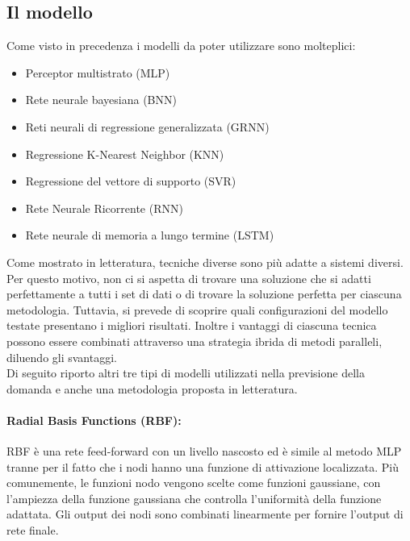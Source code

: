 \documentclass[12pt,a4paper]{report}
\begin{document}
\subsection{Il modello}
Come visto in precedenza i modelli da poter utilizzare sono molteplici:
\begin{itemize}
    \item Perceptor multistrato (MLP)
    \item Rete neurale bayesiana (BNN)
    \item Reti neurali di regressione generalizzata (GRNN)
    \item Regressione K-Nearest Neighbor (KNN)
    \item Regressione del vettore di supporto (SVR)
    \item Rete Neurale Ricorrente (RNN)
    \item Rete neurale di memoria a lungo termine (LSTM)
\end{itemize}

Come mostrato in letteratura, tecniche diverse sono più adatte a sistemi diversi. Per questo motivo, non ci si aspetta di trovare una soluzione che si adatti perfettamente a tutti i set di dati o di trovare la soluzione perfetta per ciascuna metodologia. Tuttavia, si prevede di scoprire quali configurazioni del modello testate presentano i migliori risultati.
Inoltre i vantaggi di ciascuna tecnica possono essere combinati attraverso una strategia ibrida di metodi paralleli, diluendo gli svantaggi.\\
Di seguito riporto altri tre tipi di modelli utilizzati nella previsione della domanda e anche una metodologia proposta in letteratura.

\paragraph*{Radial Basis Functions (RBF):}
RBF è una rete feed-forward con un livello nascosto ed è simile al metodo MLP tranne per il fatto che i nodi hanno una funzione di attivazione localizzata. Più comunemente, le funzioni nodo vengono scelte come funzioni gaussiane, con l'ampiezza della funzione gaussiana che controlla l'uniformità della funzione adattata. Gli output dei nodi sono combinati linearmente per fornire l'output di rete finale.
 
\end{document}
